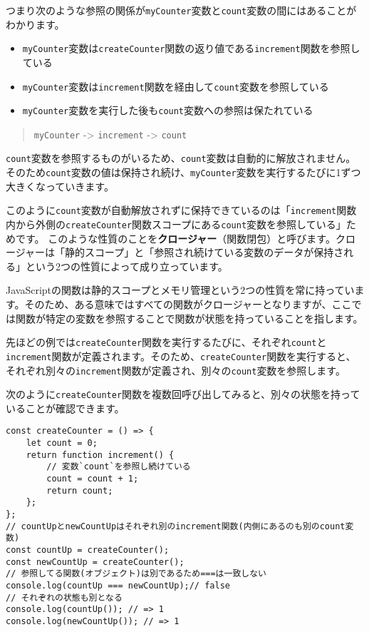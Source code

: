 つまり次のような参照の関係が\texttt{myCounter}変数と\texttt{count}変数の間にはあることがわかります。

\begin{itemize}
\item
  \texttt{myCounter}変数は\texttt{createCounter}関数の返り値である\texttt{increment}関数を参照している
\item
  \texttt{myCounter}変数は\texttt{increment}関数を経由して\texttt{count}変数を参照している
\item
  \texttt{myCounter}変数を実行した後も\texttt{count}変数への参照は保たれている
\end{itemize}

\begin{quote}
\texttt{myCounter} -\textgreater{}
\texttt{increment} -\textgreater{}
\texttt{count}
\end{quote}

\texttt{count}変数を参照するものがいるため、\texttt{count}変数は自動的に解放されません。
そのため\texttt{count}変数の値は保持され続け、\texttt{myCounter}変数を実行するたびに1ずつ大きくなっていきます。

このように\texttt{count}変数が自動解放されずに保持できているのは「\texttt{increment}関数内から外側の\texttt{createCounter}関数スコープにある\texttt{count}変数を参照している」ためです。
このような性質のことを\textbf{クロージャー}（関数閉包）と呼びます。クロージャーは「静的スコープ」と「参照され続けている変数のデータが保持される」という2つの性質によって成り立っています。

JavaScriptの関数は静的スコープとメモリ管理という2つの性質を常に持っています。そのため、ある意味ではすべての関数がクロージャーとなりますが、ここでは関数が特定の変数を参照することで関数が状態を持っていることを指します。

先ほどの例では\texttt{createCounter}関数を実行するたびに、それぞれ\texttt{count}と\texttt{increment}関数が定義されます。そのため、\texttt{createCounter}関数を実行すると、それぞれ別々の\texttt{increment}関数が定義され、別々の\texttt{count}変数を参照します。

次のように\texttt{createCounter}関数を複数回呼び出してみると、別々の状態を持っていることが確認できます。

\begin{lstlisting}
const createCounter = () => {
    let count = 0;
    return function increment() {
        // 変数`count`を参照し続けている
        count = count + 1;
        return count;
    };
};
// countUpとnewCountUpはそれぞれ別のincrement関数(内側にあるのも別のcount変数)
const countUp = createCounter();
const newCountUp = createCounter();
// 参照してる関数(オブジェクト)は別であるため===は一致しない
console.log(countUp === newCountUp);// false
// それぞれの状態も別となる
console.log(countUp()); // => 1
console.log(newCountUp()); // => 1
\end{lstlisting}

